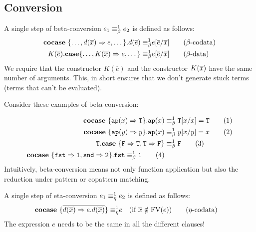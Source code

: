 \documentclass[twoside,12pt,a4paper]{article}
\begin{document}
\subsection{Conversion}

\begin{definition} \label{sec:betaconv}
    A single step of beta-conversion $e_1 \equiv_{\beta}^1 e_2$ is defined as follows:
    \begin{align*}
        \textbf{cocase}\ \{\dots,d(\overline{x}) \Rightarrow e, \dots\}.d(\overline{e})
        \equiv_{\beta}^1 & e[\overline{e}/\overline{x}]  
        \tag{$\beta$-codata}\\
        K(\overline{e}).\textbf{case}\{\dots,K(\overline{x})\Rightarrow e,\dots\}
        \equiv_{\beta}^1 & e[\overline{e}/\overline{x}] 
        \tag{$\beta$-data}
    \end{align*}
    We require that the constructor $K(\overline{e})$ and the constructor $K(\overline{x})$ have the same number of arguments.
    This, in short ensures that we don't generate stuck terms (terms that can't be evaluated).
\end{definition}
Consider these examples of beta-conversion:
\begin{example}
    \begin{align*}
        \textbf{cocase}\ \{\texttt{ap}(x)\Rightarrow \mathtt{T}\}.\texttt{ap}(x)&\equiv_{\beta}^1 \mathtt{T}[x/x] = \mathtt{T} 
        \tag{1}\\
        \textbf{cocase}\ \{\texttt{ap}(y)\Rightarrow y\}.\texttt{ap}(x) &\equiv_{\beta}^1 y[x/y]= x
        \tag{2}\\
        \mathtt{T}.\textbf{case}\ \{\mathtt{F}\Rightarrow \mathtt{T}, \mathtt{T} \Rightarrow \mathtt{F}\}&\equiv_{\beta}^1\mathtt{F}
        \tag{3}\\
        \textbf{cocase}\ \{\mathtt{fst\Rightarrow 1, snd\Rightarrow 2}\}.\mathtt{fst}\equiv_{\beta}^1 \mathtt{1}
        \tag{4}
    \end{align*}
    Intuitively, beta-conversion means not only function application but also the reduction under pattern or copattern matching. %
\end{example}

\begin{definition}
    A single step of eta-conversion $e_1 \equiv_{\eta}^1 e_2$ is defined as follows:
    \begin{align*}
        \textbf{cocase}\ \{\overline{d(\overline{x})\Rightarrow e.d(\overline{x})}\}
        \equiv_{\eta}^1 & e \quad (\text{if } \overline{x}\notin \text{FV}(e)) \tag{$\eta$-codata}
    \end{align*}
    The expression $e$ needs to be the same in all the different clauses!
\end{definition}
\end{document}
